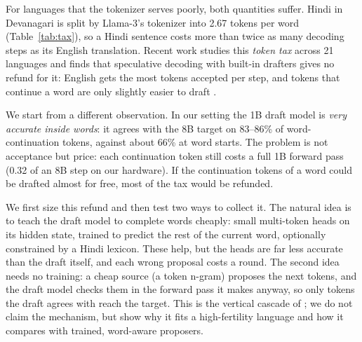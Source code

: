 \documentclass[11pt]{article}
\begin{document}
For languages that the tokenizer serves poorly, both quantities suffer. Hindi in Devanagari is split
by Llama-3's tokenizer into 2.67 tokens per word (Table~\ref{tab:tax}), so a Hindi sentence costs
more than twice as many decoding steps as its English translation. Recent work studies this
\emph{token tax} across 21 languages and finds that speculative decoding with built-in drafters gives
no refund for it: English gets the most tokens accepted per step, and tokens that continue a word are
only slightly easier to draft \citep{notokenrefund2026}.

We start from a different observation. In our setting the 1B draft model is \emph{very accurate
inside words}: it agrees with the 8B target on 83--86\% of word-continuation tokens, against about
66\% at word starts. The problem is not acceptance but price: each continuation token still costs a
full 1B forward pass (0.32 of an 8B step on our hardware). If the continuation tokens of a word could
be drafted almost for free, most of the tax would be refunded.

We first size this refund and then test two ways to collect it. The natural idea is to teach the draft
model to complete words cheaply: small multi-token heads on its hidden state, trained to predict the
rest of the current word, optionally constrained by a Hindi lexicon. These help, but the heads are far
less accurate than the draft itself, and each wrong proposal costs a round. The second idea needs no
training: a cheap source (a token n-gram) proposes the next tokens, and the draft model checks them in
the forward pass it makes anyway, so only tokens the draft agrees with reach the target. This is the
vertical cascade of \citet{chen2024cascade}; we do not claim the mechanism, but show why it fits a
high-fertility language and how it compares with trained, word-aware proposers.
\end{document}

